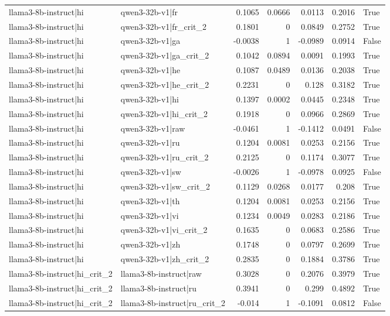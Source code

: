 \begin{table}
\begin{tabular}{l l r r r r l}
llama3-8b-instruct|hi & qwen3-32b-v1|fr & 0.1065 & 0.0666 & 0.0113 & 0.2016 & True \\
llama3-8b-instruct|hi & qwen3-32b-v1|fr_crit_2 & 0.1801 & 0 & 0.0849 & 0.2752 & True \\
llama3-8b-instruct|hi & qwen3-32b-v1|ga & -0.0038 & 1 & -0.0989 & 0.0914 & False \\
llama3-8b-instruct|hi & qwen3-32b-v1|ga_crit_2 & 0.1042 & 0.0894 & 0.0091 & 0.1993 & True \\
llama3-8b-instruct|hi & qwen3-32b-v1|he & 0.1087 & 0.0489 & 0.0136 & 0.2038 & True \\
llama3-8b-instruct|hi & qwen3-32b-v1|he_crit_2 & 0.2231 & 0 & 0.128 & 0.3182 & True \\
llama3-8b-instruct|hi & qwen3-32b-v1|hi & 0.1397 & 0.0002 & 0.0445 & 0.2348 & True \\
llama3-8b-instruct|hi & qwen3-32b-v1|hi_crit_2 & 0.1918 & 0 & 0.0966 & 0.2869 & True \\
llama3-8b-instruct|hi & qwen3-32b-v1|raw & -0.0461 & 1 & -0.1412 & 0.0491 & False \\
llama3-8b-instruct|hi & qwen3-32b-v1|ru & 0.1204 & 0.0081 & 0.0253 & 0.2156 & True \\
llama3-8b-instruct|hi & qwen3-32b-v1|ru_crit_2 & 0.2125 & 0 & 0.1174 & 0.3077 & True \\
llama3-8b-instruct|hi & qwen3-32b-v1|sw & -0.0026 & 1 & -0.0978 & 0.0925 & False \\
llama3-8b-instruct|hi & qwen3-32b-v1|sw_crit_2 & 0.1129 & 0.0268 & 0.0177 & 0.208 & True \\
llama3-8b-instruct|hi & qwen3-32b-v1|th & 0.1204 & 0.0081 & 0.0253 & 0.2156 & True \\
llama3-8b-instruct|hi & qwen3-32b-v1|vi & 0.1234 & 0.0049 & 0.0283 & 0.2186 & True \\
llama3-8b-instruct|hi & qwen3-32b-v1|vi_crit_2 & 0.1635 & 0 & 0.0683 & 0.2586 & True \\
llama3-8b-instruct|hi & qwen3-32b-v1|zh & 0.1748 & 0 & 0.0797 & 0.2699 & True \\
llama3-8b-instruct|hi & qwen3-32b-v1|zh_crit_2 & 0.2835 & 0 & 0.1884 & 0.3786 & True \\
llama3-8b-instruct|hi_crit_2 & llama3-8b-instruct|raw & 0.3028 & 0 & 0.2076 & 0.3979 & True \\
llama3-8b-instruct|hi_crit_2 & llama3-8b-instruct|ru & 0.3941 & 0 & 0.299 & 0.4892 & True \\
llama3-8b-instruct|hi_crit_2 & llama3-8b-instruct|ru_crit_2 & -0.014 & 1 & -0.1091 & 0.0812 & False \\

\end{tabular}
\end{table}
